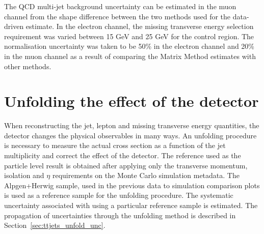 The QCD multi-jet background uncertainty can be estimated in the muon channel from the shape difference between the two methods used for the data-driven estimate.
In the electron channel, the missing transverse energy selection requirement was varied between 15 GeV and 25 GeV for the control region.
The normalisation uncertainty was taken to be 50\% in the electron channel and 20\% in the muon channel as a result of comparing the Matrix Method estimates
with other methods.




\section{Unfolding the effect of the detector}
\label{sec:ttjets_unfolding}

When reconstructing the jet, lepton and missing transverse energy quantities,
the detector changes the physical observables in many ways.
An unfolding procedure is
necessary to measure the actual cross section as a function of the jet multiplicity and correct the effect of the
detector.
The reference used as the particle level result is obtained after applying only the transverse momentum, isolation and $\eta$ requirements
on the Monte Carlo simulation metadata.
The Alpgen+Herwig sample, used in the previous data to simulation comparison plots is used as a reference sample for the
unfolding procedure.
The systematic uncertainty associated with using a particular reference sample is estimated.
The propagation of uncertainties
through the unfolding method is described in Section~\ref{sec:ttjets_unfold_unc}.

